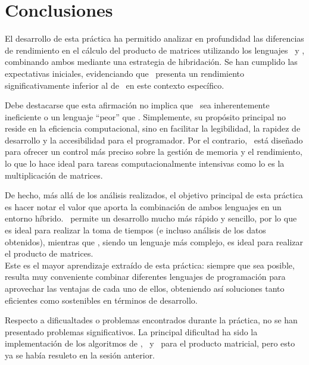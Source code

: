 \pagestyle{fancy}
\fancyhead[l]{\autorUO}
\fancyfoot[l]{\asignaturaAbbr}
\fancyfoot[r]{\fecha}

\section{Conclusiones} \label{sec:5}
El desarrollo de esta práctica ha permitido analizar en profundidad las diferencias de rendimiento en el cálculo del producto de matrices 
utilizando los lenguajes \python\ y \C, combinando ambos mediante una estrategia de hibridación. Se han cumplido las expectativas iniciales, 
evidenciando que \python\ presenta un rendimiento significativamente inferior al de \C\ en este contexto específico. 

Debe destacarse que esta afirmación no implica que \python\ sea inherentemente ineficiente o un lenguaje ``peor'' que \C. Simplemente, 
su propósito principal no reside en la eficiencia computacional, sino en facilitar la legibilidad, la rapidez de desarrollo y la accesibilidad 
para el programador. Por el contrario, \C\ está diseñado para ofrecer un control más preciso sobre la gestión de memoria y el rendimiento, 
lo que lo hace ideal para tareas computacionalmente intensivas como lo es la multiplicación de matrices.

De hecho, más allá de los análisis realizados, el objetivo principal de esta práctica es hacer notar el valor que aporta la combinación 
de ambos lenguajes en un entorno híbrido. \python\ permite un desarrollo mucho más rápido y sencillo, por lo que es ideal para realizar 
la toma de tiempos (e incluso análisis de los datos obtenidos), mientras que \C, siendo un lenguaje más complejo, es ideal 
para realizar el producto de matrices. \\
Este es el mayor aprendizaje extraído de esta práctica: siempre que sea posible, resulta muy conveniente combinar diferentes lenguajes de 
programación para aprovechar las ventajas de cada uno de ellos, obteniendo así soluciones tanto eficientes como sostenibles en términos 
de desarrollo.

Respecto a dificualtades o problemas encontrados durante la práctica, no se han presentado problemas significativos. La principal 
dificultad ha sido la implementación de los algoritmos de \rowmajor, \colmajor\ y \zorder\ para el producto matricial, pero esto ya 
se había resuleto en la sesión anterior. 